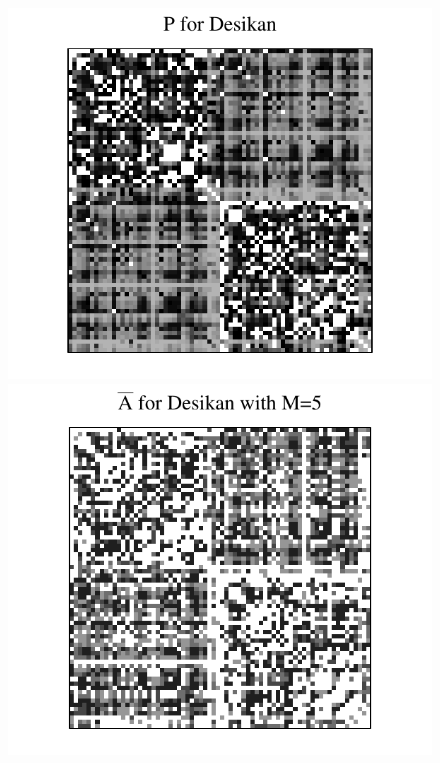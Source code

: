 \documentclass[10pt,letterpaper]{article}
\begin{document}
\begin{figure}[!htbp]
\centering
\includegraphics[height=.2\textheight]{P_desikan.pdf} \hspace{-35pt}
\includegraphics[height=.201\textheight]{Abar_desikan_m5.pdf} \hspace{-35pt}

\end{figure}
\end{document}
